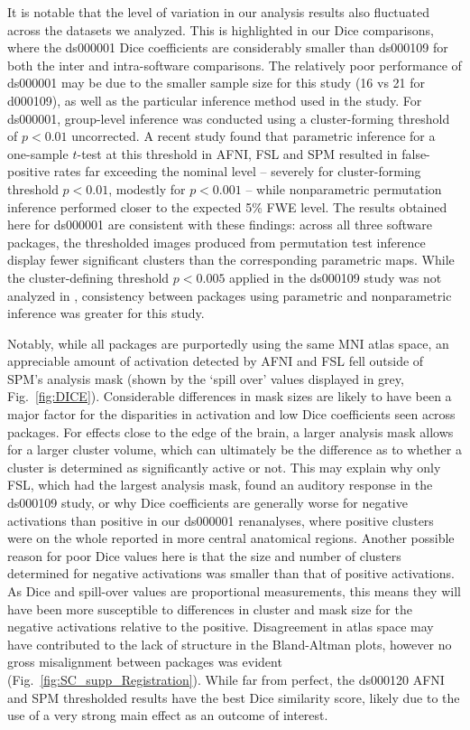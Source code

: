 It is notable that the level of variation in our analysis results also fluctuated across the datasets we analyzed. This is highlighted in our Dice comparisons, where the ds000001 Dice coefficients are considerably smaller than ds000109 for both the inter and intra-software comparisons. The relatively poor performance of ds000001 may be due to the smaller sample size for this study (16 vs 21 for d000109), as well as the particular inference method used in the study. For ds000001, group-level inference was conducted using a cluster-forming threshold of $p < 0.01$ uncorrected. A recent study \citep{Eklund2016-ak} found that parametric inference for a one-sample $t$-test at this threshold in AFNI, FSL and SPM resulted in false-positive rates far exceeding the nominal level -- severely for cluster-forming threshold $p < 0.01$, modestly for $p < 0.001$ -- while nonparametric permutation inference performed closer to the expected 5\% FWE level. The results obtained here for ds000001 are consistent with these findings: across all three software packages, the thresholded images produced from permutation test inference display fewer significant clusters than the corresponding parametric maps. While the cluster-defining threshold $p < 0.005$ applied in the ds000109 study was not analyzed in \citeauthor{Eklund2016-ak}, consistency between packages using parametric and nonparametric inference was greater for this study.

Notably, while all packages are purportedly using the same MNI atlas space, an appreciable amount of activation detected by AFNI and FSL fell outside of SPM's analysis mask (shown by the `spill over' values displayed in grey, Fig.\ \ref{fig:DICE}). Considerable differences in mask sizes are likely to have been a major factor for the disparities in activation and low Dice coefficients seen across packages. For effects close to the edge of the brain, a larger analysis mask allows for a larger cluster volume, which can ultimately be the difference as to whether a cluster is determined as significantly active or not. This may explain why only FSL, which had the largest analysis mask, found an auditory response in the ds000109 study, or why Dice coefficients are generally worse for negative activations than positive in our ds000001 renanalyses, where positive clusters were on the whole reported in more central anatomical regions. Another possible reason for poor Dice values here is that the size and number of clusters determined for negative activations was smaller than that of positive activations. As Dice and spill-over values are proportional measurements, this means they will have been more susceptible to differences in cluster and mask size for the negative activations relative to the positive. Disagreement in atlas space may have contributed to the lack of structure in the Bland-Altman plots, however no gross misalignment between packages was evident (Fig.\ \ref{fig:SC_supp_Registration}). While far from perfect, the ds000120 AFNI and SPM thresholded results have the best Dice similarity score, likely due to the use of a very strong main effect as an outcome of interest.

